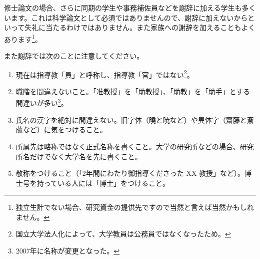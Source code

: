 修士論文の場合、さらに同期の学生や事務補佐員などを謝辞に加える学生も多くいます。これは科学論文として必須ではありませんので、謝辞に加えないからといって失礼に当たるわけではありません。また家族への謝辞を加えることもよくあります\footnote{独立生計でない場合、研究資金の提供先ですので当然と言えば当然かもしれません。}。

また謝辞では次のことに注意してください。

\begin{enumerate}
\item 現在は指導教「員」と呼称し、指導教「官」ではない\footnote{国立大学法人化によって、大学教員は公務員ではなくなったため。}。
\item 職階を間違えないこと。「准教授」を「助教授」、「助教」を「助手」とする間違いが多い\footnote{2007年に名称が変更となった。}。
\item 氏名の漢字を絶対に間違えない。旧字体（曉と暁など）や異体字（齋藤と斎藤など）に気をつけること。
\item 所属先は略称ではなく正式名称を書くこと。大学の研究所などの場合、研究所名だけでなく大学名を先に書くこと。
\item 敬称をつけること（「2年間にわたり御指導くださった XX 教授」など）。博士号を持っている人には「博士」をつけること。
\end{enumerate}
